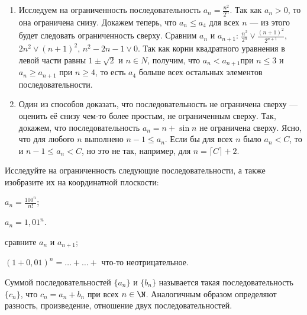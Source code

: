 \documentclass[a4paper, 12pt, num=2426, date=01.09.2020]{listok}
\begin{document}
\begin{example*}
\begin{enumerate}
    \item Исследуем на ограниченность последовательность $a_n = \frac{n^2}{2^n}$.
        Так как $a_n > 0$, то она ограничена снизу.
        Докажем теперь, что $a_n \le a_4$ для всех $n$ --- из этого будет следовать ограниченность сверху.
        Сравним $a_n$ и $a_{n+1}$: \;
        $\frac{n^2}{2^n} \vee \frac{{(n+1)}^2}{2^{n+1}}$, \; $2n^2 \vee {(n+1)}^2$, \; $n^2 - 2n - 1 \vee 0$.
        Так как корни квадратного уравнения в левой части равны $1 \pm \sqrt{2}$ и $n \in N$, получим,
        что $a_n < a_{n+1}$при $n \le 3$ и $a_n \ge a_{n+1}$ при $n \ge 4$,
        то есть $a_4$ больше всех остальных элементов последовательности.

    \item Один из способов доказать, что последовательность не ограничена сверху ---
        оценить её снизу чем-то более простым, не ограниченным сверху.
        Так, докажем, что последовательность $a_n = n + \sin n$ не ограничена сверху.
        Ясно, что для любого $n$ выполнено $n - 1 \le a_n$.
        Если бы для всех $n$ было $a_n < C$, то и $n - 1 \le a_n < C$, но это не так, например,
        для $n = \lceil C\rceil + 2$.
\end{enumerate}
\end{example*}

\begin{problem}[$\mathghost$]\label{exfirst}
    Исследуйте на ограниченность следующие последовательности, а также изобразите их на координатной плоскости:
    \begin{probparts}
        \item $a_n = \frac{100^n}{n!}$;
        \item $a_n = 1{,}01^n$.
    \end{probparts}
\end{problem}
\begin{note}
\begin{probparts}
    \item сравните $a_n$ и $a_{n+1}$;
    \item ${(1 + 0{,}01)}^n = \ldots + \ldots + $ что-то неотрицательное.
\end{probparts}
\end{note}
\begin{definition}
    Суммой последовательностей $\{a_n\}$ и $\{b_n\}$ называется такая последовательность $\{c_n\}$,
    что $c_n = a_n + b_n$ при всех $n \in \N$.
    Аналогичным образом определяют разность, произведение, отношение двух последовательностей.
\end{definition}
\end{document}
